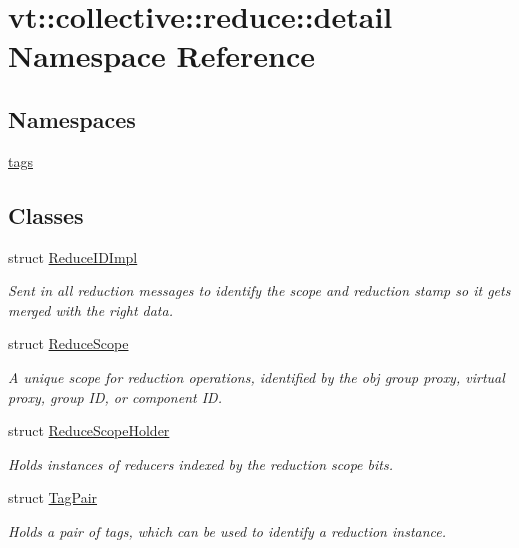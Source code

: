 \hypertarget{namespacevt_1_1collective_1_1reduce_1_1detail}{}\section{vt\+:\+:collective\+:\+:reduce\+:\+:detail Namespace Reference}
\label{namespacevt_1_1collective_1_1reduce_1_1detail}
\subsection*{Namespaces}
\begin{DoxyCompactItemize}
\item 
 \hyperlink{namespacevt_1_1collective_1_1reduce_1_1detail_1_1tags}{tags}
\end{DoxyCompactItemize}
\subsection*{Classes}
\begin{DoxyCompactItemize}
\item 
struct \hyperlink{structvt_1_1collective_1_1reduce_1_1detail_1_1_reduce_i_d_impl}{Reduce\+I\+D\+Impl}
\begin{DoxyCompactList}\small\item\em Sent in all reduction messages to identify the scope and reduction stamp so it gets merged with the right data. \end{DoxyCompactList}\item 
struct \hyperlink{structvt_1_1collective_1_1reduce_1_1detail_1_1_reduce_scope}{Reduce\+Scope}
\begin{DoxyCompactList}\small\item\em A unique scope for reduction operations, identified by the obj group proxy, virtual proxy, group ID, or component ID. \end{DoxyCompactList}\item 
struct \hyperlink{structvt_1_1collective_1_1reduce_1_1detail_1_1_reduce_scope_holder}{Reduce\+Scope\+Holder}
\begin{DoxyCompactList}\small\item\em Holds instances of reducers indexed by the reduction scope bits. \end{DoxyCompactList}\item 
struct \hyperlink{structvt_1_1collective_1_1reduce_1_1detail_1_1_tag_pair}{Tag\+Pair}
\begin{DoxyCompactList}\small\item\em Holds a pair of tags, which can be used to identify a reduction instance. \end{DoxyCompactList}\end{DoxyCompactItemize}
